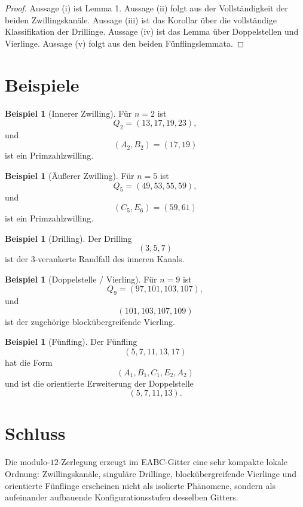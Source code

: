 \documentclass[11pt,a4paper]{article}
\theoremstyle{definition}
\newtheorem{beispiel}[satz]{Beispiel}
\theoremstyle{remark}
\begin{document}
	\begin{proof}
		Aussage \textup{(i)} ist Lemma 1. Aussage \textup{(ii)} folgt aus der Vollständigkeit der beiden
		Zwillingskanäle. Aussage \textup{(iii)} ist das Korollar über die vollständige Klassifikation der
		Drillinge. Aussage \textup{(iv)} ist das Lemma über Doppelstellen und Vierlinge. Aussage
		\textup{(v)} folgt aus den beiden Fünflingslemmata.
	\end{proof}
	
	\section{Beispiele}
	
	\begin{beispiel}[Innerer Zwilling]
		Für \(n=2\) ist
		\[
		Q_2=(13,17,19,23),
		\]
		und
		\[
		(A_2,B_2)=(17,19)
		\]
		ist ein Primzahlzwilling.
	\end{beispiel}
	
	\begin{beispiel}[Äußerer Zwilling]
		Für \(n=5\) ist
		\[
		Q_5=(49,53,55,59),
		\]
		und
		\[
		(C_5,E_6)=(59,61)
		\]
		ist ein Primzahlzwilling.
	\end{beispiel}
	
	\begin{beispiel}[Drilling]
		Der Drilling
		\[
		(3,5,7)
		\]
		ist der \(3\)-verankerte Randfall des inneren Kanals.
	\end{beispiel}
	
	\begin{beispiel}[Doppelstelle / Vierling]
		Für \(n=9\) ist
		\[
		Q_9=(97,101,103,107),
		\]
		und
		\[
		(101,103,107,109)
		\]
		ist der zugehörige blockübergreifende Vierling.
	\end{beispiel}
	
	\begin{beispiel}[Fünfling]
		Der Fünfling
		\[
		(5,7,11,13,17)
		\]
		hat die Form
		\[
		(A_1,B_1,C_1,E_2,A_2)
		\]
		und ist die orientierte Erweiterung der Doppelstelle
		\[
		(5,7,11,13).
		\]
	\end{beispiel}
	
	\section{Schluss}
	
	Die modulo-\(12\)-Zerlegung erzeugt im EABC-Gitter eine sehr kompakte lokale Ordnung:
	Zwillingskanäle, singuläre Drillinge, blockübergreifende Vierlinge und orientierte
	Fünflinge erscheinen nicht als isolierte Phänomene, sondern als aufeinander aufbauende
	Konfigurationsstufen desselben Gitters.
	
\end{document}
